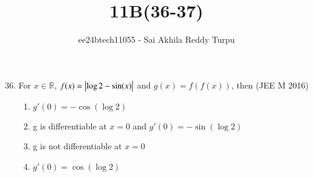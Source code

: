 \documentclass[journal,12pt,twocolumn]{IEEEtran}
\theoremstyle{remark}
\begin{document}

\vspace{3cm}

\title{11B(36-37)}
\author{ee24btech11055 - Sai Akhila Reddy Turpu}
\maketitle
\newpage
\bigskip

\renewcommand{\thefigure}{\theenumi}
\renewcommand{\thetable}{\theenumi}
\begin{enumerate}
		\setcounter{enumi}{35}


	\item For $x\in\mathbb{R}$, $f(x)=\left\vert\log 2-\sin(x)\right\vert$ and 
	$g(x)=f(f(x))$, then 
	\hfill{(JEE M 2016)}
	\begin{enumerate}[label=(\alph*)]
		\item $g'(0) = -\cos(\log 2)$
		\item g is differentiable at $x=0$ and $g'(0) = -\sin(\log 2)$
		\item g is not differentiable at $x=0$
		\item $g'(0) =  \cos(\log 2)$
	\end{enumerate}


\end{enumerate}
\end{document}
